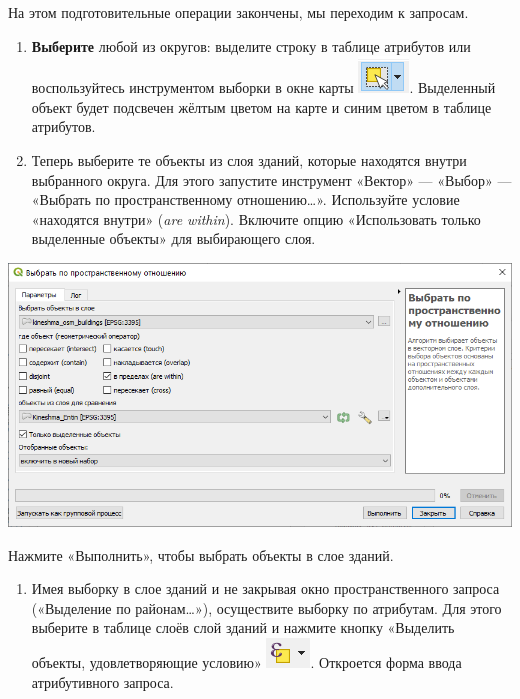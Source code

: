 \documentclass[
  12pt,
]{book}
\providecommand{\tightlist}{%
  \setlength{\itemsep}{0pt}\setlength{\parskip}{0pt}}
\begin{document}
На этом подготовительные операции закончены, мы переходим к запросам.

\begin{enumerate}
\def\labelenumi{\arabic{enumi}.}
\setcounter{enumi}{2}
\item
  \textbf{Выберите} любой из округов: выделите строку в таблице атрибутов или воспользуйтесь инструментом выборки в окне карты \includegraphics{images/Ex05/selection1.png}. Выделенный объект будет подсвечен жёлтым цветом на карте и синим цветом в таблице атрибутов.
\item
  Теперь выберите те объекты из слоя зданий, которые находятся внутри выбранного округа. Для этого запустите инструмент «Вектор» --- «Выбор» --- «Выбрать по пространственному отношению\ldots». Используйте условие «находятся внутри» (\emph{are within}). Включите опцию «Использовать только выделенные объекты» для выбирающего слоя.
\end{enumerate}

\includegraphics{images/Ex05_Vectorization/selection2.png}

Нажмите «Выполнить», чтобы выбрать объекты в слое зданий.

\begin{enumerate}
\def\labelenumi{\arabic{enumi}.}
\setcounter{enumi}{5}
\tightlist
\item
  Имея выборку в слое зданий и не закрывая окно пространственного запроса («Выделение по районам\ldots»), осуществите выборку по атрибутам. Для этого выберите в таблице слоёв слой зданий и нажмите кнопку «Выделить объекты, удовлетворяющие условию» \includegraphics{images/Ex05/selection3.png}. Откроется форма ввода атрибутивного запроса.
\end{enumerate}
\end{document}
